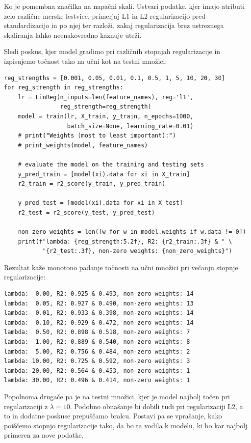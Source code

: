 \begin{exercise}{Ko je pomembna značilka na napačni skali.}
Ustvari podatke, kjer imajo atributi zelo različne merske lestvice, primerjaj L1 in L2 regularizacijo pred standardizacijo in po njej ter razloži, zakaj regularizacija brez ustreznega skaliranja lahko neenakovredno kaznuje uteži.
\end{exercise}

Sledi poskus, kjer model gradimo pri različnih stopnjah regularizacije in izpisujemo točnost tako na učni kot na testni množici:

\vspace*{3mm}
\begin{lstlisting}
reg_strengths = [0.001, 0.05, 0.01, 0.1, 0.5, 1, 5, 10, 20, 30]
for reg_strength in reg_strengths:
    lr = LinReg(n_inputs=len(feature_names), reg='l1',
                reg_strength=reg_strength)
    model = train(lr, X_train, y_train, n_epochs=1000, 
                  batch_size=None, learning_rate=0.01)
    # print("Weights (most to least important):")
    # print_weights(model, feature_names)

    # evaluate the model on the training and testing sets
    y_pred_train = [model(xi).data for xi in X_train]
    r2_train = r2_score(y_train, y_pred_train)

    y_pred_test = [model(xi).data for xi in X_test]
    r2_test = r2_score(y_test, y_pred_test)

    non_zero_weights = len([w for w in model.weights if w.data != 0])
    print(f"lambda: {reg_strength:5.2f}, R2: {r2_train:.3f} & " \
           "{r2_test:.3f}, non-zero weights: {non_zero_weights}")
\end{lstlisting}

Rezultat kaže monotono padanje točnosti na učni množici pri večanju stopnje regularizacije:
%
\vspace*{3mm}
\begin{lstlisting}
lambda:  0.00, R2: 0.925 & 0.493, non-zero weights: 14
lambda:  0.05, R2: 0.927 & 0.490, non-zero weights: 13
lambda:  0.01, R2: 0.933 & 0.398, non-zero weights: 14
lambda:  0.10, R2: 0.929 & 0.472, non-zero weights: 14
lambda:  0.50, R2: 0.898 & 0.518, non-zero weights: 7
lambda:  1.00, R2: 0.889 & 0.540, non-zero weights: 8
lambda:  5.00, R2: 0.756 & 0.484, non-zero weights: 2
lambda: 10.00, R2: 0.725 & 0.592, non-zero weights: 3
lambda: 20.00, R2: 0.564 & 0.453, non-zero weights: 1
lambda: 30.00, R2: 0.496 & 0.414, non-zero weights: 1
\end{lstlisting}
%
Popolnoma drugače pa je na testni množici, kjer je model najbolj točen pri regularizaciji z $\lambda=10$. Podobno obnašanje bi dobili tudi pri regularizaciji L2, a to in dodatne poskuse prepuščamo bralcu. Postavi pa se vprašanje, kako poiščemo stopnjo regularizacije tako, da bo ta vodila k modelu, ki bo kar najbolj primeren za nove podatke.

